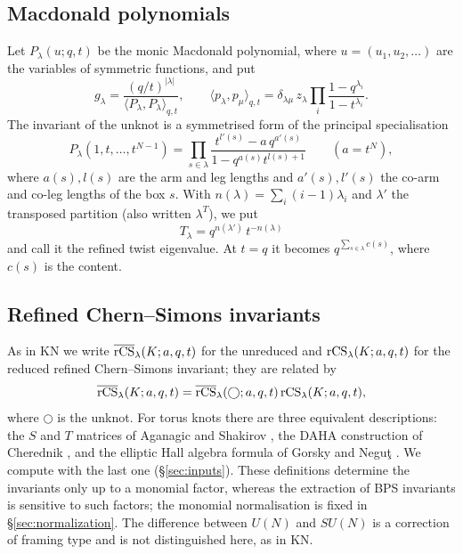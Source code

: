 \subsection{Macdonald polynomials}
Let $P_\lambda(u;q,t)$ be the monic Macdonald polynomial, where $u=(u_1,u_2,\dots)$ are the variables of symmetric functions, and put
\[
g_\lambda=\frac{(q/t)^{|\lambda|}}{\langle P_\lambda,P_\lambda\rangle_{q,t}},\qquad
\langle p_\lambda,p_\mu\rangle_{q,t}=\delta_{\lambda\mu}\,z_\lambda\prod_i\frac{1-q^{\lambda_i}}{1-t^{\lambda_i}} .
\]
The invariant of the unknot is a symmetrised form of the principal specialisation
\[
P_\lambda(1,t,\dots,t^{N-1})=\prod_{s\in\lambda}\frac{t^{l'(s)}-a\,q^{a'(s)}}{1-q^{a(s)}t^{l(s)+1}}\qquad(a=t^N),
\]
where $a(s),l(s)$ are the arm and leg lengths and $a'(s),l'(s)$ the co-arm and co-leg lengths of the box $s$.
With $n(\lambda)=\sum_i(i-1)\lambda_i$ and $\lambda'$ the transposed partition (also written $\lambda^T$), we put
\[
T_\lambda=q^{n(\lambda')}\,t^{-n(\lambda)}
\]
and call it the refined twist eigenvalue. At $t=q$ it becomes $q^{\sum_{s\in\lambda}c(s)}$, where $c(s)$ is the content.

\subsection{Refined Chern--Simons invariants}
As in KN we write $\overline{\mathrm{rCS}}_\lambda(K;a,q,t)$ for the unreduced and $\mathrm{rCS}_\lambda(K;a,q,t)$ for the reduced refined Chern--Simons invariant; they are related by
\[
\overline{\mathrm{rCS}}_\lambda(K;a,q,t)=\overline{\mathrm{rCS}}_\lambda(\bigcirc;a,q,t)\,\mathrm{rCS}_\lambda(K;a,q,t),
\]
where $\bigcirc$ is the unknot.
For torus knots there are three equivalent descriptions: the $S$ and $T$ matrices of Aganagic and Shakirov \cite{Aganagic11}, the DAHA construction of Cherednik \cite{Cherednik11},
and the elliptic Hall algebra formula of Gorsky and Negu\c{t} \cite{Gorsky13b}. We compute with the last one (\S\ref{sec:inputs}).
These definitions determine the invariants only up to a monomial factor, whereas the extraction of BPS invariants is sensitive to such factors; the monomial normalisation is fixed in \S\ref{sec:normalization}.
The difference between $U(N)$ and $SU(N)$ is a correction of framing type and is not distinguished here, as in KN.

